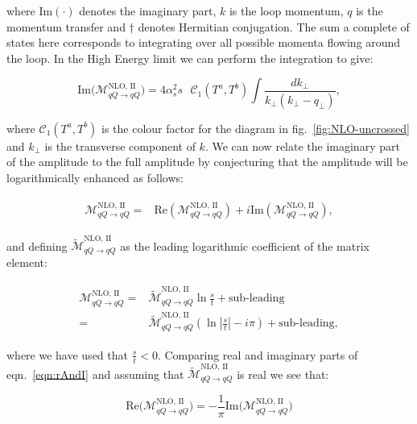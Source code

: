 	where $\text{Im}(\cdot)$ denotes the imaginary part, $k$ is the loop momentum, $q$ is the momentum
	transfer and $\dagger$ denotes Hermitian conjugation.  The sum a complete of states here
	corresponds to integrating over all possible momenta flowing around the loop. In the High Energy
	limit we can perform the integration to give:

	\begin{equation}
		\text{Im}\Big(\mathcal{M}_{qQ\rightarrow qQ}^{\text{NLO, II}}\Big) =
		4\alpha_s^2 s\text{ }\mathcal{C}_1(T^a,T^b)
		\int \frac{dk_{\perp}}{k_{\perp}(k_{\perp} - q_{\perp})},
	\end{equation}

	where $\mathcal{C}_1(T^a,T^b)$ is the colour factor for the diagram in fig.~\eqref{fig:NLO-uncrossed}
	and $k_{\perp}$ is the transverse component of $k$.  We can now relate the
	imaginary part of the amplitude to the full amplitude by conjecturing that the amplitude will be
	logarithmically enhanced as follows:

	\begin{align}
	\begin{split}
		\mathcal{M}_{qQ\rightarrow qQ}^{\text{NLO, II}} =
		&\text{Re}(\mathcal{M}_{qQ\rightarrow qQ}^{\text{NLO, II}}) +
		i\text{Im}(\mathcal{M}_{qQ\rightarrow qQ}^{\text{NLO, II}}),
	\end{split}
	\end{align}

	and defining $\widetilde{\mathcal{M}}_{qQ\rightarrow qQ}^{\text{NLO, II}}$ as the leading
	logarithmic coefficient of the matrix element:

	\begin{align}
	\begin{split}
		\mathcal{M}_{qQ\rightarrow qQ}^{\text{NLO, II}} =&\widetilde{\mathcal{M}}_{qQ\rightarrow qQ}^{\text{NLO, II}}\ln\frac{s}{t} + \text{sub-leading}\\
		=&\widetilde{\mathcal{M}}_{qQ\rightarrow qQ}^{\text{NLO, II}}
		\left(\ln\left|\frac{s}{t}\right| -i\pi\right)+ \text{sub-leading},
		\label{eqn:rAndI}
	\end{split}
	\end{align}

	where we have used that $\frac{s}{t} < 0$.  Comparing real and imaginary parts of eqn.~\eqref{eqn:rAndI}
	and assuming that $\widetilde{\mathcal{M}}_{qQ\rightarrow qQ}^{\text{NLO, II}}$ is real we see that:

	\begin{equation}
		\text{Re}\Big(\mathcal{M}_{qQ\rightarrow qQ}^{\text{NLO, II}}\Big) =
		-\frac{1}{\pi}\text{Im}\Big(\mathcal{M}_{qQ\rightarrow qQ}^{\text{NLO, II}}\Big)
	\end{equation}

